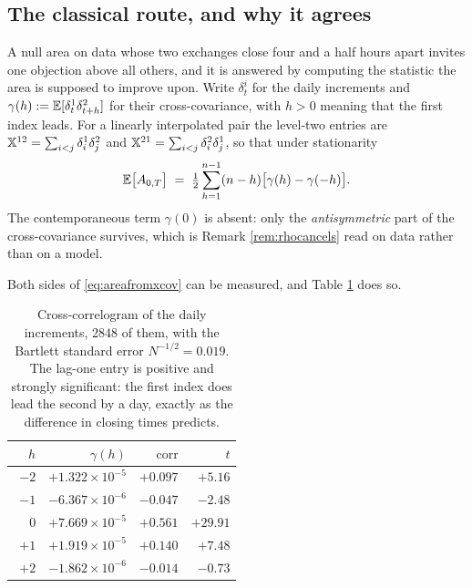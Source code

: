 \subsection{The classical route, and why it agrees}
\label{subsec:levyxcorr}

A null area on data whose two exchanges close four and a half hours apart invites one objection
above all others, and it is answered by computing the statistic the area is supposed to improve
upon. Write $\delta^{i}_{t}$ for the daily increments and
$\gamma(h) := \mathbb{E}[\delta^{1}_{t}\delta^{2}_{t+h}]$ for their cross-covariance, with $h>0$ meaning
that the first index leads. For a linearly interpolated pair the level-two entries are
$\mathbb{X}^{12}=\sum_{i<j}\delta^{1}_{i}\delta^{2}_{j}$ and
$\mathbb{X}^{21}=\sum_{i<j}\delta^{2}_{i}\delta^{1}_{j}$, so that under stationarity
\begin{equation}\label{eq:areafromxcov}
  \mathbb{E}\bigl[A_{0,T}\bigr] \;=\; \tfrac12\sum_{h=1}^{n-1}(n-h)\bigl[\gamma(h)-\gamma(-h)\bigr].
\end{equation}
The contemporaneous term $\gamma(0)$ is absent: only the \emph{antisymmetric} part of the
cross-covariance survives, which is Remark \ref{rem:rhocancels} read on data rather than on a model.

Both sides of \eqref{eq:areafromxcov} can be measured, and Table \ref{tab:levyxcorr} does so.

\begin{table}[H]
\centering
\small
\begin{tabular}{rrrr}
\hline
$h$ & $\gamma(h)$ & $\mathrm{corr}$ & $t$\\
\hline
$-2$ & $+1.322\times10^{-5}$ & $+0.097$ & $+5.16$\\
$-1$ & $-6.367\times10^{-6}$ & $-0.047$ & $-2.48$\\
$\phantom{-}0$ & $+7.669\times10^{-5}$ & $+0.561$ & $+29.91$\\
$+1$ & $+1.919\times10^{-5}$ & $+0.140$ & $+7.48$\\
$+2$ & $-1.862\times10^{-6}$ & $-0.014$ & $-0.73$\\
\hline
\end{tabular}
\caption[Cross-correlogram of the daily increments]{Cross-correlogram of the daily increments, $2848$ of them, with the Bartlett standard
error $N^{-1/2}=0.019$. The lag-one entry is positive and strongly significant: the first index does
lead the second by a day, exactly as the difference in closing times predicts.}
\label{tab:levyxcorr}
\end{table}

